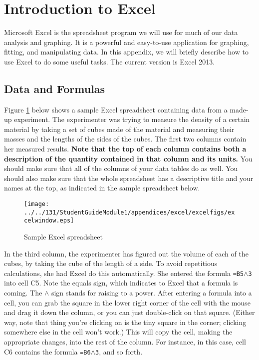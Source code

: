 
\section{Introduction to Excel}
\label{excel}

Microsoft Excel is the spreadsheet program we will use for much of our
data analysis and graphing.  It is a powerful and easy-to-use
application for graphing, fitting, and manipulating data. In this
appendix, we will briefly describe how to use Excel to do some useful
tasks.  The current version is Excel 2013.

\subsection{Data and Formulas}

Figure \ref{fig:excel} below shows a sample Excel spreadsheet containing data
from a made-up experiment.  The experimenter was trying to measure
the density of a certain material by taking a set of cubes
made of the material and measuring their masses and the lengths of
the sides of the cubes.  The first two columns contain her measured
results.  \textbf{Note that the top of each column contains both
a description of the quantity contained in that column and its units.}
You should make sure that all of the columns of your data tables do as well.
You should also make sure that the whole spreadsheet has a descriptive
title and your names at the top, as indicated in the sample spreadsheet 
below.

\begin{figure}[b!]
\centerline{\texttt{[image: ../../131/StudentGuideModule1/appendices/excel/excelfigs/excelwindow.eps]}}
\caption{Sample Excel spreadsheet}
\label{fig:excel}
\end{figure}

In the third column, the experimenter has figured out the volume
of each of the cubes, by taking the cube of the length of a side.
To avoid repetitious calculations, she had Excel do this automatically.
She entered the formula {\tt =B5$\wedge$3}  into cell C5.
Note the equals sign, which indicates to Excel that a formula is coming.
The $\wedge$ sign stands for raising to a power.  After entering a formula
into a cell, you can grab the square in the lower right corner of the
cell with the mouse and drag it down the column, or you can just double-click
on that square.  (Either way, note that thing you're clicking on is
the tiny square in the corner; clicking somewhere else in the cell won't work.)
This will copy
the cell, making the appropriate changes, into the rest of the column.
For instance, in this case, cell C6 contains the formula {\tt =B6$\wedge$3},
and so forth.

